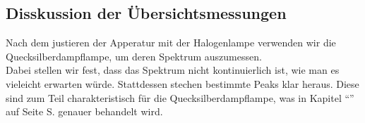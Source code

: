 \subsection{Disskussion der Übersichtsmessungen}

Nach dem justieren der Apperatur mit der Halogenlampe verwenden wir die Quecksilberdampflampe, um deren Spektrum auszumessen.\\
Dabei stellen wir fest, dass das Spektrum nicht kontinuierlich ist, wie man es vieleicht erwarten würde.
Stattdessen stechen bestimmte Peaks klar heraus. Diese sind zum Teil charakteristisch für die Quecksilberdampflampe, was in 
Kapitel "`"' auf Seite S.\pageref{Messlit} genauer behandelt wird.
